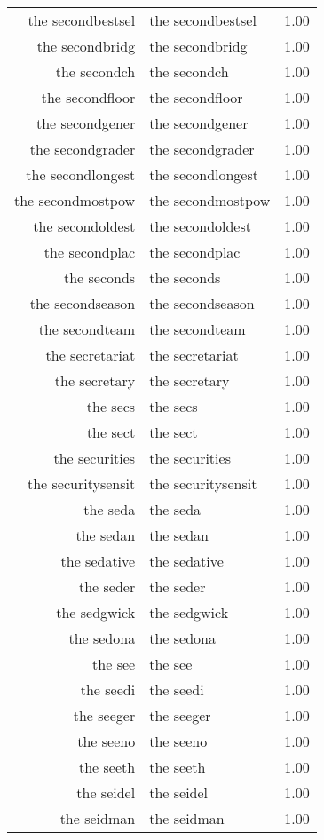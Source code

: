 \begin{table}[ht]
\begin{tabular}{rlr}
  the secondbestsel & the secondbestsel & 1.00 \\ 
  the secondbridg & the secondbridg & 1.00 \\ 
  the secondch & the secondch & 1.00 \\ 
  the secondfloor & the secondfloor & 1.00 \\ 
  the secondgener & the secondgener & 1.00 \\ 
  the secondgrader & the secondgrader & 1.00 \\ 
  the secondlongest & the secondlongest & 1.00 \\ 
  the secondmostpow & the secondmostpow & 1.00 \\ 
  the secondoldest & the secondoldest & 1.00 \\ 
  the secondplac & the secondplac & 1.00 \\ 
  the seconds & the seconds & 1.00 \\ 
  the secondseason & the secondseason & 1.00 \\ 
  the secondteam & the secondteam & 1.00 \\ 
  the secretariat & the secretariat & 1.00 \\ 
  the secretary & the secretary & 1.00 \\ 
  the secs & the secs & 1.00 \\ 
  the sect & the sect & 1.00 \\ 
  the securities & the securities & 1.00 \\ 
  the securitysensit & the securitysensit & 1.00 \\ 
  the seda & the seda & 1.00 \\ 
  the sedan & the sedan & 1.00 \\ 
  the sedative & the sedative & 1.00 \\ 
  the seder & the seder & 1.00 \\ 
  the sedgwick & the sedgwick & 1.00 \\ 
  the sedona & the sedona & 1.00 \\ 
  the see & the see & 1.00 \\ 
  the seedi & the seedi & 1.00 \\ 
  the seeger & the seeger & 1.00 \\ 
  the seeno & the seeno & 1.00 \\ 
  the seeth & the seeth & 1.00 \\ 
  the seidel & the seidel & 1.00 \\ 
  the seidman & the seidman & 1.00 \\ 

\end{tabular}
\end{table}
